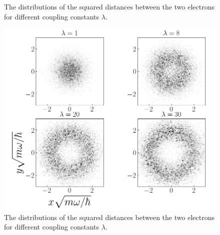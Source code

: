 \documentclass[twocolumn]{article}
\begin{document}
\begin{large}
\begin{figure}[!t]
    \caption{The distributions of the squared distances between the two electrons for different coupling constants $\lambda$.}
    \label{11apr2039}
\end{figure}
\begin{figure}[h]
    \includegraphics[scale=0.35]{2dhist.png}
    \caption{The distributions of the squared distances between the two electrons for different coupling constants $\lambda$.}
    \label{11apr2120}
\end{figure}



\end{large}
\end{document}
